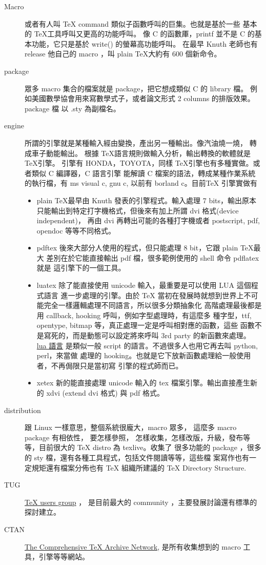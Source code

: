 \begin{description}
\item [Macro] 或者有人叫 {\TeX} command 類似子函數呼叫的巨集。也就是基於一些
基本的 \TeX 工具呼叫又更高的功能呼叫。
像 C 的函數厙，printf 並不是 C 的基本功能，它只是基於 write() 的螢幕高功能呼叫。
在最早 Knuth 老師也有 release 他自己的 macro ，叫 plain \TeX 大約有 600 個新命令。
\item [package] 眾多 macro 集合的檔案就是 package，把它想成類似 C 的 library 檔。
例如美國數學協會用來寫數學式子，或者論文形式 2 columns 的排版效果。package 檔
以 .sty 為副檔名。
\item [engine] 所謂的引擎就是某種輸入經由變換，產出另一種輸出。像汽油燒一燒，
轉成車子動能輸出。 根據 \TeX 語言規則做輸入分析，輸出轉換的軟體就是 \TeX 引擎。
引擎有 HONDA，TOYOTA，同樣 \TeX 引擎也有多種實做。或者類似 C 編譯器，C 語言引擎
能解讀 C 檔案的語法，轉成某種作業系統的執行檔，有 ms visual c, gnu c, 以前有
borland c。目前{\TeX} 引擎實做有
  \begin{itemize}
  \item plain \TeX 最早由 Knuth 發表的引擎程式。輸入處理 7 bits，輸出原本
  只能輸出到特定打字機格式，但後來有加上所謂 dvi 格式(device independent)，
  再由 dvi 再轉出可能的各種打字機或者 postscript, pdf, opendoc 等等不同格式。
  \item pdftex 後來大部分人使用的程式，但只能處理 8 bit，它跟 plain \TeX 最大
        差別在於它能直接輸出 pdf 檔，很多範例使用的 shell 命令 pdflatex 就是
        這引擎下的一個工具。
  \item luatex 除了能直接使用 unicode 輸入，最重要是可以使用 LUA 這個程式語言
	進一步處理的引擎。由於 \TeX
        當初在發展時就想到世界上不可能完全一樣邏輯處理不同語言，所以很多分類抽象化
	高階處理最後都是用 callback, hooking 呼叫，例如字型處理時，有這麼多
        種字型，ttf, opentype, bitmap 等，真正處理一定是呼叫相對應的函數，這些
        函數不是寫死的，而是動態可以設定將來呼叫 3rd party 的新函數來處理。
        \href{https://en.wikipedia.org/wiki/Lua_(programming_language)}{lua 語言}
        是類似一般 script 的語言。不過很多人也用它再去叫 python, perl，來當做
        處理的 hooking。也就是它下放新函數處理給一般使用者，不再侷限只是當初寫
        引擎的程式師而已。
  \item xetex 新的能直接處理 unicode 輸入的 tex 檔案引擎。輸出直接產生新的
        xdvi (extend dvi 格式) 與 pdf 格式。
  \end{itemize}
\item [distribution] 跟 Linux 一樣意思，整個系統很龐大，macro 眾多，
這麼多 macro package 有相依性， 要怎樣參照，
怎樣收集，怎樣改版，升級，發布等等，目前很大的 {\TeX} distro 為 texlive。收集了
很多功能的 package ，很多的 sty 檔，還有各種工具程式，包括文件閱讀等等，這些檔
案寫作也有一定規矩還有檔案分佈也有 {\TeX} 組織所建議的 TeX Directory Structure.
\item [TUG] \href{http://tug.org}{{\TeX} users group} ，
是目前最大的 community ，主要發展討論還有標準的探討建立。
\item [CTAN] \href{http://www.ctan.org}{The Comprehensive TeX Archive Network}, 
是所有收集想到的 macro 工具，引擎等等網站。
\end{description}
